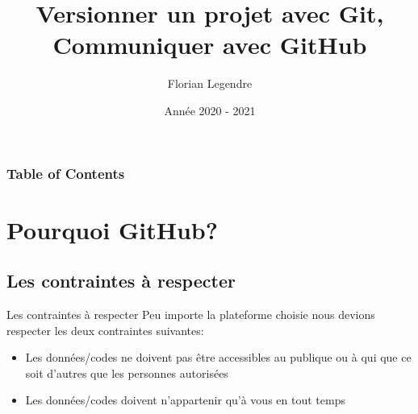 \documentclass{beamer}
\title[Github]{Versionner un projet avec Git,\\ Communiquer avec GitHub}
\author{Florian Legendre}
\institute{Université de Poitiers}
\date{Année 2020 - 2021}
\begin{document}
\frame{\titlepage}

\begin{frame}
\frametitle{Table of Contents}
\tableofcontents[hideallsubsections]
\end{frame}




\section{Pourquoi GitHub?}


\subsection{Les contraintes à respecter}
\begin{frame}{Les contraintes à respecter}
Peu importe la plateforme choisie nous devions respecter les deux contraintes suivantes:
\begin{itemize}
	\item Les données/codes ne doivent pas être accessibles au publique ou à qui que 
	      ce soit d'autres que les personnes autorisées
	\item Les données/codes doivent n'appartenir qu'à vous en tout temps
\end{itemize}
\end{frame}


\end{document}
